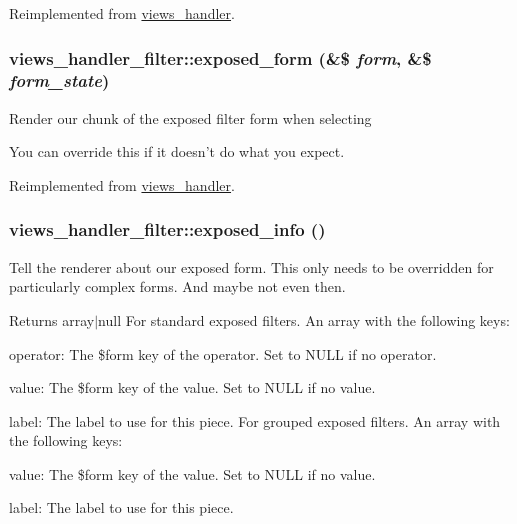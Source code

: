 Reimplemented from \hyperlink{classviews__handler_a6590edeadc036c3db0e64baa2383909e}{views\_\-handler}.\hypertarget{classviews__handler__filter_af97b055d96353032bebd186c66bbb5eb}{
\subsubsection[{exposed\_\-form}]{\setlength{\rightskip}{0pt plus 5cm}views\_\-handler\_\-filter::exposed\_\-form (\&\$ {\em form}, \/  \&\$ {\em form\_\-state})}}
\label{classviews__handler__filter_af97b055d96353032bebd186c66bbb5eb}
Render our chunk of the exposed filter form when selecting

You can override this if it doesn't do what you expect. 

Reimplemented from \hyperlink{classviews__handler_a657fbb873c6be9e1da904e2aad191f66}{views\_\-handler}.\hypertarget{classviews__handler__filter_a5405764212dfafae60fa032c217461b4}{
\subsubsection[{exposed\_\-info}]{\setlength{\rightskip}{0pt plus 5cm}views\_\-handler\_\-filter::exposed\_\-info ()}}
\label{classviews__handler__filter_a5405764212dfafae60fa032c217461b4}
Tell the renderer about our exposed form. This only needs to be overridden for particularly complex forms. And maybe not even then.

\begin{DoxyReturn}{Returns}
array$|$null For standard exposed filters. An array with the following keys:
\begin{DoxyItemize}
\item operator: The \$form key of the operator. Set to NULL if no operator.
\item value: The \$form key of the value. Set to NULL if no value.
\item label: The label to use for this piece. For grouped exposed filters. An array with the following keys:
\item value: The \$form key of the value. Set to NULL if no value.
\item label: The label to use for this piece. 
\end{DoxyItemize}
\end{DoxyReturn}


